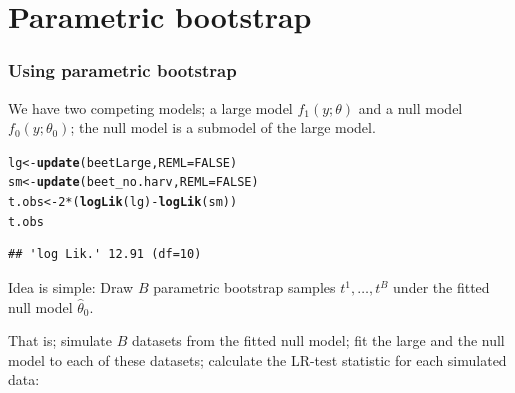 \documentclass[compress]{beamer}\usepackage[]{graphicx}\usepackage[]{color}
\makeatletter
\newcommand{\hlnum}[1]{\textcolor[rgb]{0.686,0.059,0.569}{#1}}%
\newcommand{\hlopt}[1]{\textcolor[rgb]{0,0,0}{#1}}%
\newcommand{\hlstd}[1]{\textcolor[rgb]{0.345,0.345,0.345}{#1}}%
\newcommand{\hlkwb}[1]{\textcolor[rgb]{0.69,0.353,0.396}{#1}}%
\newcommand{\hlkwc}[1]{\textcolor[rgb]{0.333,0.667,0.333}{#1}}%
\newcommand{\hlkwd}[1]{\textcolor[rgb]{0.737,0.353,0.396}{\textbf{#1}}}%
\newenvironment{kframe}{%
 \def\at@end@of@kframe{}%
 \ifinner\ifhmode%
  \def\at@end@of@kframe{\end{minipage}}%
  \begin{minipage}{\columnwidth}%
 \fi\fi%
 \def\FrameCommand##1{\hskip\@totalleftmargin \hskip-\fboxsep
 \colorbox{shadecolor}{##1}\hskip-\fboxsep
     \hskip-\linewidth \hskip-\@totalleftmargin \hskip\columnwidth}%
 \MakeFramed {\advance\hsize-\width
   \@totalleftmargin\z@ \linewidth\hsize
   \@setminipage}}%
 {\par\unskip\endMakeFramed%
 \at@end@of@kframe}
\newenvironment{knitrout}{}{} %
\newenvironment{sframe}
{\begin{frame} [containsverbatim] }
  {\end{frame}}
\makeatother
\begin{document}
\section{Parametric bootstrap}
\label{sec:parametric-bootstrap}
\begin{sframe}
\frametitle{Using parametric bootstrap}

We have two competing models; a large model $f_1(y; \theta)$
and a null model $f_0(y; \theta_0)$; the null model is a submodel of the large model. 

\begin{knitrout}\tiny
{}\color{fgcolor}\begin{kframe}
\begin{alltt}
\hlstd{lg} \hlkwb{<-} \hlkwd{update}\hlstd{(beetLarge,} \hlkwc{REML}\hlstd{=}\hlnum{FALSE}\hlstd{)}
\hlstd{sm} \hlkwb{<-} \hlkwd{update}\hlstd{(beet_no.harv,} \hlkwc{REML}\hlstd{=}\hlnum{FALSE}\hlstd{)}
\hlstd{t.obs} \hlkwb{<-} \hlnum{2}\hlopt{*}\hlstd{(}\hlkwd{logLik}\hlstd{(lg)}\hlopt{-}\hlkwd{logLik}\hlstd{(sm))}
\hlstd{t.obs}
\end{alltt}
\begin{verbatim}
## 'log Lik.' 12.91 (df=10)
\end{verbatim}
\end{kframe}
\end{knitrout}

Idea is simple: Draw $B$ parametric bootstrap samples
$t^1, \dots, t^B$ under the fitted null model $\hat \theta_0$. 

That is; simulate $B$
datasets from the fitted null model; fit the large and the null model to each of
these datasets; calculate the LR-test statistic for each simulated data:
\end{sframe}
\end{document}
